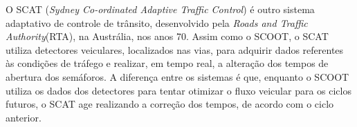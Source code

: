 O SCAT (\textit{Sydney Co-ordinated Adaptive Traffic Control}) é outro sistema adaptativo de controle de trânsito, desenvolvido pela \textit{Roads and Traffic Authority}(RTA), na Austrália, nos anos 70. Assim como o SCOOT, o SCAT utiliza detectores veiculares, localizados nas vias, para adquirir dados referentes às condições de tráfego e realizar, em tempo real, a alteração dos tempos de abertura dos semáforos\cite{scat}.
A diferença entre os sistemas é que, enquanto o SCOOT utiliza os dados dos detectores para tentar otimizar o fluxo veicular para os ciclos futuros, o SCAT age realizando a correção dos tempos, de acordo com o ciclo anterior.


